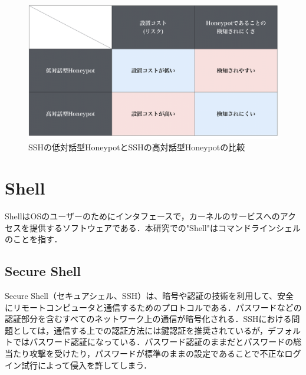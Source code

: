 \vspace{10mm}
\begin{figure}[H]
    \centering
    \includegraphics[width=1.0\textwidth]{figures/compare.png}
    \caption{SSHの低対話型HoneypotとSSHの高対話型Honeypotの比較}
    \label{fig:evo}
\end{figure}


\section{Shell}
\label{tech:Shell}
ShellはOSのユーザーのためにインタフェースで，カーネルのサービスへのアクセスを提供するソフトウェアである．本研究での"Shell"はコマンドラインシェルのことを指す．

\subsection{Secure Shell}
\label{tech:Secure Shell}
Secure Shell（セキュアシェル、SSH）は、暗号や認証の技術を利用して、安全にリモートコンピュータと通信するためのプロトコルである．パスワードなどの認証部分を含むすべてのネットワーク上の通信が暗号化される．\cite{ssh}SSHにおける問題としては，通信する上での認証方法には鍵認証を推奨されているが，デフォルトではパスワード認証になっている．パスワード認証のままだとパスワードの総当たり攻撃を受けたり，パスワードが標準のままの設定であることで不正なログイン試行によって侵入を許してしまう．


